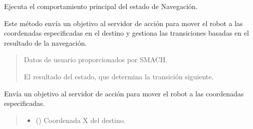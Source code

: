 \documentclass[a4paper,10pt,spanish]{sphinxmanual}
\begin{document}
\begin{fulllineitems}
\begin{fulllineitems}
\begin{quote}
\begin{description}
\end{description}\end{quote}

\end{fulllineitems}


\begin{fulllineitems}
\label{\detokenize{squad_state_manager:squad_state_manager.EstadoNavegacion.execute}}
\pysigstartsignatures
{}
\pysigstopsignatures
\sphinxAtStartPar
Ejecuta el comportamiento principal del estado de Navegación.

\sphinxAtStartPar
Este método envía un objetivo al servidor de acción  para mover el robot
a las coordenadas especificadas en el destino y gestiona las transiciones basadas
en el resultado de la navegación.
\begin{quote}\begin{description}
\sphinxAtStartPar
{} \textendash{} Datos de usuario proporcionados por SMACH.

\sphinxAtStartPar
El resultado del estado, que determina la transición siguiente.

\sphinxAtStartPar
{}

\end{description}\end{quote}

\end{fulllineitems}


\begin{fulllineitems}
\label{\detokenize{squad_state_manager:squad_state_manager.EstadoNavegacion.moveTo}}
\pysigstartsignatures
{}
\pysigstopsignatures
\sphinxAtStartPar
Envía un objetivo al servidor de acción  para mover el robot a las coordenadas especificadas.
\begin{quote}\begin{description}
\begin{itemize}
\item {} 
\sphinxAtStartPar
{} () \textendash{} Coordenada X del destino.


\end{itemize}
\end{description}
\end{quote}
\end{fulllineitems}
\end{fulllineitems}
\end{document}
